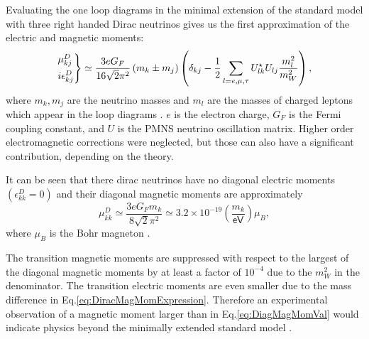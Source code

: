 Evaluating the one loop diagrams in the minimal extension of the standard model with three right handed Dirac neutrinos gives us the first approximation of the electric and magnetic moments:
\begin{equation}\label{eq:DiracMagMomExpression}
\begin{rcases}
\mu^D_{kj}\\
i\epsilon^D_{kj}
\end{rcases}
\simeq\frac{3eG_F}{16\sqrt{2}\pi^2}\left(m_k\pm m_j\right)\left(\delta_{kj}-\frac{1}{2}\sum_{l=e,\mu ,\tau}U^{\star}_{lk}U_{lj}\frac{m_l^2}{m_W^2}\right),
\end{equation}
where $m_k,m_j$ are the neutrino masses and $m_l$ are the masses of charged leptons which appear in the loop diagrams \cite{nuElmagInt2015.pdf}. $e$ is the electron charge, $G_F$ is the Fermi coupling constant, and $U$ is the PMNS neutrino oscillation matrix. Higher order electromagnetic corrections were neglected, but those can also have a significant contribution, depending on the theory.

It can be seen that there dirac neutrinos have no diagonal electric moments $\left(\epsilon_{kk}^D=0\right)$ and their diagonal magnetic moments are approximately
\begin{equation}\label{eq:DiagMagMomVal}
\mu_{kk}^D\simeq\frac{3eG_Fm_k}{8\sqrt{2}\pi^2}\simeq 3.2\times 10^{-19}\left(\frac{m_k}{\textsf{eV}}\right)\mu_B,
\end{equation}
where $\mu_B$ is the Bohr magneton \cite{nuElmagInt2015.pdf}.

The transition magnetic moments are suppressed with respect to the largest of the diagonal magnetic moments by at least a factor of $10^{-4}$ due to the $m_W^2$ in the denominator. The transition electric moments are even smaller due to the mass difference in Eq.\ref{eq:DiracMagMomExpression}. Therefore an experimental observation of a magnetic moment larger than in Eq.\ref{eq:DiagMagMomVal} would indicate physics beyond the minimally extended standard model \cite{nuElmagInt2015.pdf,nuMMMajoranaBounds2006.pdf}.

